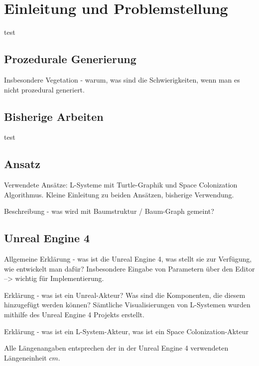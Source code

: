 \chapter{Einleitung und Problemstellung}
test
\section{Prozedurale Generierung}

Insbesondere Vegetation - warum, was sind die Schwierigkeiten, wenn man es nicht prozedural generiert.

\section{Bisherige Arbeiten}

test

\section{Ansatz}
Verwendete Ansätze: L-Systeme mit Turtle-Graphik und Space Colonization Algorithmus. Kleine Einleitung zu beiden Ansätzen, bisherige Verwendung.

Beschreibung - was wird mit Baumstruktur / Baum-Graph gemeint?


\section{Unreal Engine 4}

Allgemeine Erklärung - was ist die Unreal Engine 4, was stellt sie zur Verfügung, wie entwickelt man dafür? Insbesondere Eingabe von Parametern über den Editor --> wichtig für Implementierung.

Erklärung - was ist ein Unreal-Akteur? Was sind die Komponenten, die diesem hinzugefügt werden können?
Sämtliche Visualisierungen von L-Systemen wurden mithilfe des Unreal Engine 4 Projekts erstellt.

Erklärung - was ist ein L-System-Akteur, was ist ein Space Colonization-Akteur

Alle Längenangaben entsprechen der in der Unreal Engine 4 verwendeten Längeneinheit $cm$.